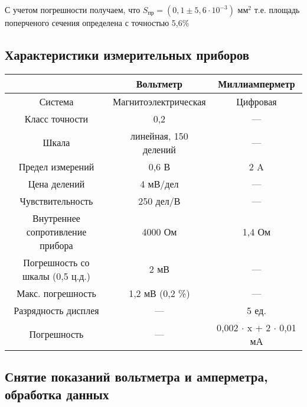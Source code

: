 \documentclass[a4paper, 12pt]{article}
\begin{document}
	С учетом погрешности получаем, что $S_\text{пр} = \left( 0,1 \pm 5,6 \cdot 10^{-3}\right) \text{ мм}^2$ т.е. площадь поперченого сечения определена с точностью 5,6\%
 
        \newpage
        \centering
	\subsection*{Характеристики измерительных приборов}
	\begin{longtable}[H]{|c|c|c|}
		\hline
		& Вольтметр & Миллиамперметр\\
		\hline
		Система & Магнитоэлектрическая & Цифровая \\
		Класс точности & 0,2 & --- \\
		Шкала & линейная, 150 делений & ---\\
            Предел измерений & 0,6 В & 2 A \\
		Цена делений & 4 мВ/дел & ---\\
		Чувствительность  & 250 дел/В & --- \\
            Внутреннее сопротивление прибора & 4000 Ом & 1,4 Ом \\
		  Погрешность со шкалы (0,5 ц.д.)  & 2 мВ & ---\\
            Макс. погрешность & 1,2 мВ (0,2 \%) & --- \\
            Разрядность дисплея & --- & 5 ед. \\
            Погрешность & --- & 0,002 $\cdot$ x + 2 $\cdot$ 0,01 мА \\
		\hline
	\end{longtable}

	\centering
	\subsection*{Снятие показаний вольтметра и амперметра, обработка данных}
	
\end{document}

